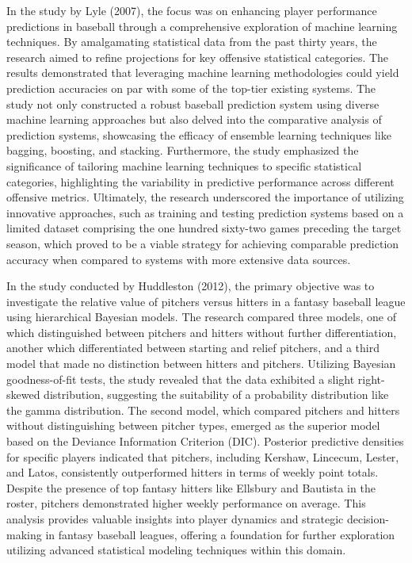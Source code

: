 \documentclass[12pt, english]{article}
\begin{document}
In the study by Lyle (2007), the focus was on enhancing player performance predictions in baseball through a comprehensive exploration of machine learning techniques. By amalgamating statistical data from the past thirty years, the research aimed to refine projections for key offensive statistical categories. The results demonstrated that leveraging machine learning methodologies could yield prediction accuracies on par with some of the top-tier existing systems. The study not only constructed a robust baseball prediction system using diverse machine learning approaches but also delved into the comparative analysis of prediction systems, showcasing the efficacy of ensemble learning techniques like bagging, boosting, and stacking. Furthermore, the study emphasized the significance of tailoring machine learning techniques to specific statistical categories, highlighting the variability in predictive performance across different offensive metrics. Ultimately, the research underscored the importance of utilizing innovative approaches, such as training and testing prediction systems based on a limited dataset comprising the one hundred sixty-two games preceding the target season, which proved to be a viable strategy for achieving comparable prediction accuracy when compared to systems with more extensive data sources.

In the study conducted by Huddleston (2012), the primary objective was to investigate the relative value of pitchers versus hitters in a fantasy baseball league using hierarchical Bayesian models. The research compared three models, one of which distinguished between pitchers and hitters without further differentiation, another which differentiated between starting and relief pitchers, and a third model that made no distinction between hitters and pitchers. Utilizing Bayesian goodness-of-fit tests, the study revealed that the data exhibited a slight right-skewed distribution, suggesting the suitability of a probability distribution like the gamma distribution. The second model, which compared pitchers and hitters without distinguishing between pitcher types, emerged as the superior model based on the Deviance Information Criterion (DIC). Posterior predictive densities for specific players indicated that pitchers, including Kershaw, Lincecum, Lester, and Latos, consistently outperformed hitters in terms of weekly point totals. Despite the presence of top fantasy hitters like Ellsbury and Bautista in the roster, pitchers demonstrated higher weekly performance on average. This analysis provides valuable insights into player dynamics and strategic decision-making in fantasy baseball leagues, offering a foundation for further exploration utilizing advanced statistical modeling techniques within this domain.
\end{document}
